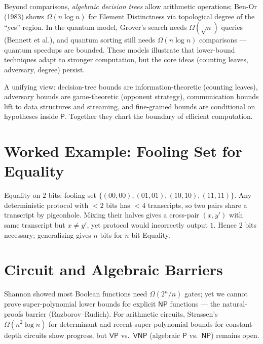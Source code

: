 Beyond comparisons, \emph{algebraic decision trees} allow arithmetic operations; Ben-Or (1983) shows $\Omega(n\log n)$ for Element Distinctness via topological degree of the ``yes'' region. In the quantum model, Grover's search needs $\Omega(\sqrt{n})$ queries (Bennett et al.), and quantum sorting still needs $\Omega(n\log n)$ comparisons --- quantum speedups are bounded. These models illustrate that lower-bound techniques adapt to stronger computation, but the core ideas (counting leaves, adversary, degree) persist.

A unifying view: decision-tree bounds are information-theoretic (counting leaves), adversary bounds are game-theoretic (opponent strategy), communication bounds lift to data structures and streaming, and fine-grained bounds are conditional on hypotheses inside $\mathsf{P}$. Together they chart the boundary of efficient computation.


\section{Worked Example: Fooling Set for Equality}
\label{sec:fooling}

Equality on $2$ bits: fooling set $\{(00,00),(01,01),(10,10),(11,11)\}$. Any deterministic protocol with $<2$ bits has $<4$ transcripts, so two pairs share a transcript by pigeonhole. Mixing their halves gives a cross-pair $(x,y')$ with same transcript but $x\ne y'$, yet protocol would incorrectly output $1$. Hence $2$ bits necessary; generalising gives $n$ bits for $n$-bit Equality.

\section{Circuit and Algebraic Barriers}
\label{sec:circuit}

Shannon showed most Boolean functions need $\Omega(2^n/n)$ gates; yet we cannot prove super-polynomial lower bounds for explicit $\mathsf{NP}$ functions --- the natural-proofs barrier (Razborov--Rudich). For arithmetic circuits, Strassen's $\Omega(n^2\log n)$ for determinant and recent super-polynomial bounds for constant-depth circuits show progress, but $\mathsf{VP}$ vs.\ $\mathsf{VNP}$ (algebraic $\mathsf{P}$ vs.\ $\mathsf{NP}$) remains open.

